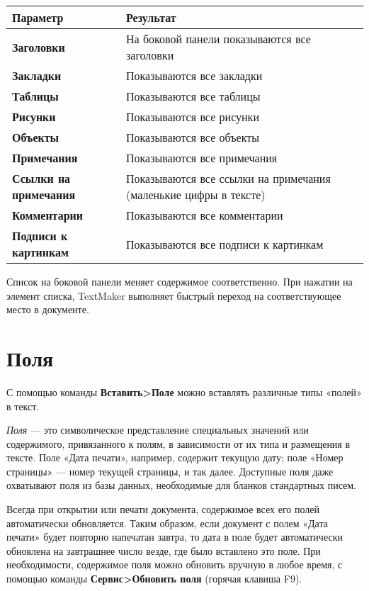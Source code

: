 \documentclass[a4paper,10pt]{article}
\begin{document}
\begin{center}
\begin{tabular}{ | m{5cm} | m{9cm} | }
\hline
 \textbf{Параметр} & \textbf{Результат} \\ 
 \hline
 \textbf{Заголовки} & На боковой панели показываются все заголовки\\
\hline
\textbf{Закладки} & Показываются все закладки\\
\hline
\textbf{Таблицы} & Показываются все таблицы\\
\hline
\textbf{Рисунки} & Показываются все рисунки\\
\hline
\textbf{Объекты} & Показываются все объекты\\
\hline
\textbf{Примечания} & Показываются все примечания\\
\hline
\textbf{Ссылки на примечания} & Показываются все ссылки на примечания (маленькие цифры в тексте)\\
\hline
\textbf{Комментарии} & Показываются все комментарии\\
\hline
\textbf{Подписи к картинкам} & Показываются все подписи к картинкам\\
\hline
\end{tabular}
\end{center}

Список на боковой панели меняет содержимое соответственно. При нажатии на элемент списка, TextMaker выполняет быстрый переход на соответствующее место в документе.

\section{Поля}
С помощью команды \textbf{Вставить>Поле} можно вставлять различные типы  «полей» в текст.

\textit{Поля} --- это символическое представление специальных значений или содержимого, привязанного к полям, в зависимости от их типа и размещения в тексте. Поле «Дата печати», например, содержит текущую дату; поле «Номер страницы» --- номер текущей страницы, и так далее. Доступные поля даже охватывают поля из базы данных, необходимые для бланков стандартных писем.

Всегда при открытии или печати документа, содержимое всех его полей автоматически обновляется. Таким образом, если документ с полем «Дата печати» будет повторно напечатан завтра, то дата в поле будет автоматически обновлена на завтрашнее число везде, где было вставлено это поле. При необходимости, содержимое поля можно обновить вручную в любое время, с помощью команды \textbf{Сервис>Обновить поля} (горячая клавиша F9).
\end{document}
